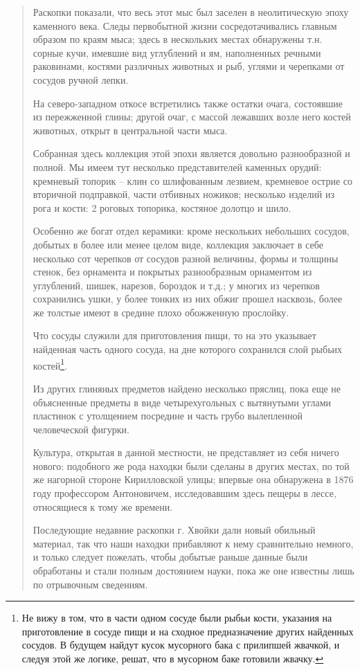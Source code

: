 \begin{quotation}
Раскопки показали, что весь этот мыс был заселен в неолитическую эпоху каменного века. Следы первобытной жизни сосредотачивались главным образом по краям мыса; здесь в нескольких местах обнаружены т.н. сорные кучи, имевшие вид углублений и ям, наполненных речными раковинами, костями различных животных и рыб, углями и черепками от сосудов ручной лепки.

На северо-западном откосе встретились также остатки очага, состоявшие из пережженной глины; другой очаг, с массой лежавших возле него костей животных, открыт в центральной части мыса.

Собранная здесь коллекция этой эпохи является довольно разнообразной и полной. Мы имеем тут несколько представителей каменных орудий: кремневый топорик – клин со шлифованным лезвием, кремневое острие со вторичной подправкой, части отбивных ножиков; несколько изделий из рога и кости: 2 роговых топорика, костяное долотцо и шило.

Особенно же богат отдел керамики: кроме нескольких небольших сосудов, добытых в более или менее целом виде, коллекция заключает в себе несколько сот черепков от сосудов разной величины, формы и толщины стенок, без орнамента и покрытых разнообразным орнаментом из углублений, шишек, нарезов, бороздок и т.д.; у многих из черепков сохранились ушки, у более тонких из них обжиг прошел насквозь, более же толстые имеют в средине плохо обожженную прослойку.

Что сосуды служили для приготовления пищи, то на это указывает найденная часть одного сосуда, на дне которого сохранился слой рыбьих костей\footnote{Не вижу в том, что в части одном сосуде были рыбьи кости, указания на приготовление в сосуде пищи и на сходное предназначение других найденных сосудов. В будущем найдут кусок мусорного бака с прилипшей жвачкой, и следуя этой же логике, решат, что в мусорном баке готовили жвачку.}.

Из других глиняных предметов найдено нес\-колько пряслиц, пока еще не объясненные предметы в виде четырехугольных с вытянутыми углами пластинок с утолщением посредине и часть грубо вылепленной человеческой фигурки.

Культура, открытая в данной местности, не представляет из себя ничего нового: подобного же рода находки были сделаны в других местах, по той же нагорной стороне Кирилловской улицы; впервые она обнаружена в 1876 году профессором Антоновичем, исследовавшим здесь пещеры в лессе, относящиеся к тому же времени.

Последующие недавние раскопки г. Хвойки дали новый обильный материал, так что наши находки прибавляют к нему сравнительно немного, и только следует пожелать, чтобы добытые раньше данные были обработаны и стали полным достоянием науки, пока же оне известны лишь по отрывочным сведениям.


\end{quotation}
